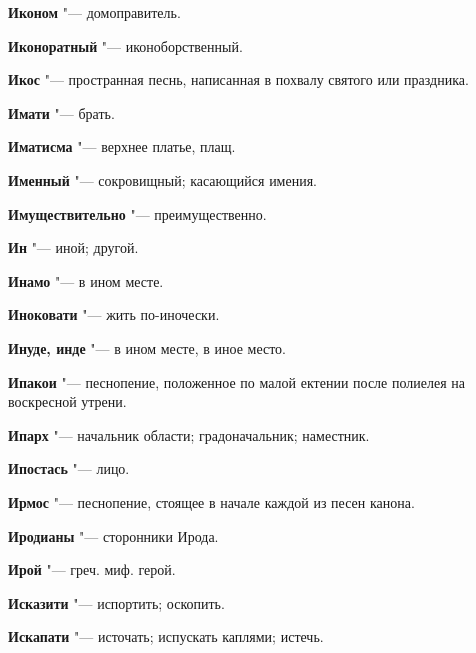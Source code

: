 \begin{mymulticols}{2}
\noindent\textbf{Иконом} "--- домоправитель. 




\noindent\textbf{Иконоратный} "--- иконоборственный. 




\noindent\textbf{Икос} "--- пространная песнь, написанная в похвалу святого или праздника. 




\noindent\textbf{Имати} "--- брать. 




\noindent\textbf{Иматисма} "--- верхнее платье, плащ. 




\noindent\textbf{Именный} "--- сокровищный; касающийся имения. 




\noindent\textbf{Имуществительно} "--- преимущественно. 




\noindent\textbf{Ин} "--- иной; другой. 




\noindent\textbf{Инамо} "--- в ином месте. 




\noindent\textbf{Иноковати} "--- жить по-иночески. 




\noindent\textbf{Инуде, инде} "--- в ином месте, в иное место. 




\noindent\textbf{Ипакои} "--- песнопение, положенное по малой ектении после полиелея на воскресной утрени. 




\noindent\textbf{Ипарх} "--- начальник области; градоначальник; наместник. 




\noindent\textbf{Ипостась} "--- лицо. 




\noindent\textbf{Ирмос} "--- песнопение, стоящее в начале каждой из песен канона. 




\noindent\textbf{Иродианы} "--- сторонники Ирода. 




\noindent\textbf{Ирой} "--- греч. миф. герой. 




\noindent\textbf{Исказити} "--- испортить; оскопить. 




\noindent\textbf{Искапати} "--- источать; испускать каплями; истечь. 





\end{mymulticols}
